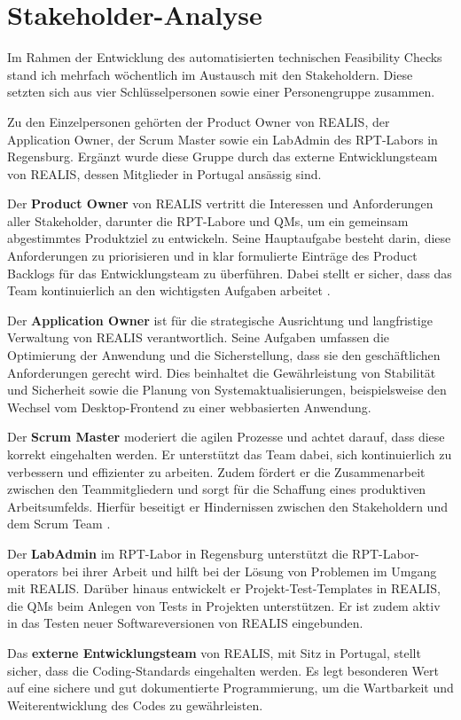 \section{Stakeholder-Analyse}
Im Rahmen der Entwicklung des automatisierten technischen Feasibility Checks stand ich mehrfach wöchentlich im Austausch mit den Stakeholdern. Diese setzten sich aus vier Schlüsselpersonen sowie einer Personengruppe zusammen.

Zu den Einzelpersonen gehörten der Product Owner von \gls{REALIS}, der Application Owner, der Scrum Master sowie ein LabAdmin des \gls{RPT}-Labors in Regensburg. Ergänzt wurde diese Gruppe durch das externe Entwicklungsteam von \gls{REALIS}, dessen Mitglieder in Portugal ansässig sind.

Der \textbf{Product Owner} von \gls{REALIS} vertritt die Interessen und Anforderungen aller Stakeholder, darunter die \gls{RPT}-Labore und \glspl{QM}, um ein gemeinsam abgestimmtes Produktziel zu entwickeln. Seine Hauptaufgabe besteht darin, diese Anforderungen zu priorisieren und in klar formulierte Einträge des Product Backlogs für das Entwicklungsteam zu überführen. Dabei stellt er sicher, dass das Team kontinuierlich an den wichtigsten Aufgaben arbeitet \cite{scrumguide2020}.

Der \textbf{Application Owner} ist für die strategische Ausrichtung und langfristige Verwaltung von \gls{REALIS} verantwortlich. Seine Aufgaben umfassen die Optimierung der Anwendung und die Sicherstellung, dass sie den geschäftlichen Anforderungen gerecht wird. Dies beinhaltet die Gewährleistung von Stabilität und Sicherheit sowie die Planung von Systemaktualisierungen, beispielsweise den Wechsel vom Desktop-Frontend zu einer webbasierten Anwendung.

Der \textbf{Scrum Master} moderiert die agilen Prozesse und achtet darauf, dass diese korrekt eingehalten werden. Er unterstützt das Team dabei, sich kontinuierlich zu verbessern und effizienter zu arbeiten. Zudem fördert er die Zusammenarbeit zwischen den Teammitgliedern und sorgt für die Schaffung eines produktiven Arbeitsumfelds. Hierfür beseitigt er Hindernissen zwischen den Stakeholdern und dem Scrum Team \cite{scrumguide2020}.

Der \textbf{LabAdmin} im \gls{RPT}-Labor in Regensburg unterstützt die \gls{RPT}-Labor-\glspl{operator} bei ihrer Arbeit und hilft bei der Lösung von Problemen im Umgang mit \gls{REALIS}. Darüber hinaus entwickelt er Projekt-Test-Templates in \gls{REALIS}, die \glspl{QM} beim Anlegen von Tests in Projekten unterstützen. Er ist zudem aktiv in das Testen neuer Softwareversionen von \gls{REALIS} eingebunden.


Das \textbf{externe Entwicklungsteam} von \gls{REALIS}, mit Sitz in Portugal, stellt sicher, dass die Coding-Standards eingehalten werden. Es legt besonderen Wert auf eine sichere und gut dokumentierte Programmierung, um die Wartbarkeit und Weiterentwicklung des Codes zu gewährleisten.